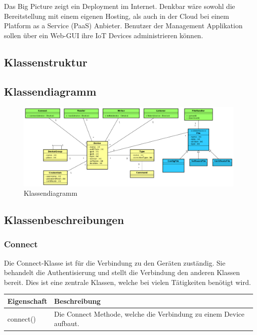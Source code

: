 Das Big Picture zeigt ein Deployment im Internet. Denkbar wäre sowohl die Bereitstellung mit einem eigenen Hosting, als auch in der Cloud bei einem Platform as a Service (PaaS) Anbieter. Benutzer der Management Applikation sollen über ein Web-GUI ihre IoT Devices administrieren können.
\newpage

\begin{landscape}
\section{Klassenstruktur}
\subsection{Klassendiagramm}
\begin{figure}[H]
\centering
\includegraphics[width=1\textwidth]{images/domainmodel.png}
\caption{Klassendiagramm}
\end{figure}
\end{landscape}
\subsection{Klassenbeschreibungen}
\subsubsection{Connect}
Die Connect-Klasse ist für die Verbindung zu den Geräten zuständig. Sie behandelt die Authentisierung und stellt die Verbindung den anderen Klassen bereit. Dies ist eine zentrale Klassen, welche bei vielen Tätigkeiten benötigt wird.
\begin{table}[H]
\centering
    \begin{tabular}{@{}l p{14.1cm} @{}}\toprule    
    {Eigenschaft} & {Beschreibung}\\ \midrule
    connect() & Die Connect Methode, welche die Verbindung zu einem Device aufbaut.\\
    \bottomrule
    \end{tabular}
\end{table}

